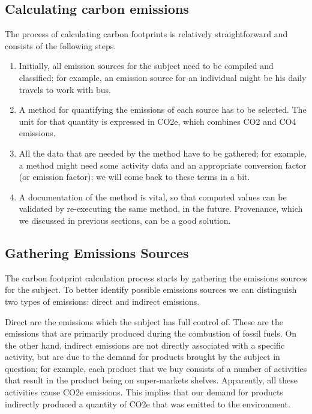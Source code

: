 \subsection{Calculating carbon emissions}

The process of calculating carbon footprints is relatively straightforward and consists of the following steps.

\begin{enumerate}
  \item
        Initially, all emission sources for the subject need to be compiled and classified; for example, an emission source for an individual might be his daily travels to work with bus.
  \item
        A method for quantifying the emissions of each source has to be selected. The unit for that quantity is expressed in CO2e, which combines CO2 and CO4 emissions.
  \item
        All the data that are needed by the method have to be gathered; for example, a method might need some activity data\cite{reference25} and an appropriate conversion factor (or emission factor); we will come back to these terms in a bit.
  \item
        A documentation of the method is vital, so that computed values can be validated by re-executing the same method, in the future. Provenance, which we discussed in previous sections, can be a good solution.
\end{enumerate}


\subsection{Gathering Emissions Sources}

The carbon footprint calculation process starts by gathering the emissions sources for the subject. To better identify possible emissions sources we can distinguish two types of emissions: direct and indirect emissions.

Direct are the emissions which the subject has full control of. These are the emissions that are primarily produced during the combustion of fossil fuels. On the other hand, indirect emissions are not directly associated with a specific activity, but are due to the demand for products brought by the subject in question; for example, each product that we buy consists of a number of activities that result in the product being on super-markets shelves. Apparently, all these activities cause CO2e emissions. This implies that our demand for products indirectly produced a quantity of CO2e that was emitted to the environment.

